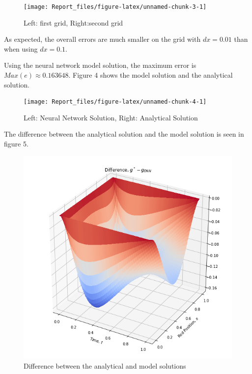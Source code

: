 \documentclass[]{article}
\begin{document}
\begin{figure}

{\centering \texttt{[image: Report\_files/figure-latex/unnamed-chunk-3-1]} 

}

\caption{Left: first grid, Right:second grid}\label{fig:unnamed-chunk-3}
\end{figure}

As expected, the overall errors are much smaller on the grid with
\(dx=0.01\) than when using \(dx=0.1\).

Using the neural network model solution, the maximum error is
\(Max(e)\approx 0.163648\). Figure 4 shows the model solution and the
analytical solution.

\begin{figure}

{\centering \texttt{[image: Report\_files/figure-latex/unnamed-chunk-4-1]} 

}

\caption{Left: Neural Network Solution, Right: Analytical Solution}\label{fig:unnamed-chunk-4}
\end{figure}

The difference between the analytical solution and the model solution is
seen in figure 5.

\begin{figure}

{\centering \includegraphics[width=1\linewidth]{plots/Figure 8} 

}

\caption{Difference between the analytical and model solutions}\label{fig:unnamed-chunk-5}
\end{figure}
\end{document}
